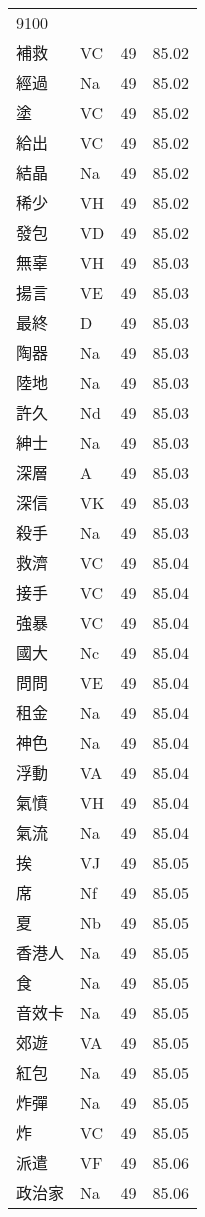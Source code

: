 \documentclass[twocolumn]{book}
\begin{document}
\begin{supertabular}{llrr}
9100\\
補救 & VC & 49 &  85.02\\
經過 & Na & 49 &  85.02\\
塗 & VC & 49 &  85.02\\
給出 & VC & 49 &  85.02\\
結晶 & Na & 49 &  85.02\\
稀少 & VH & 49 &  85.02\\
發包 & VD & 49 &  85.02\\
無辜 & VH & 49 &  85.03\\
揚言 & VE & 49 &  85.03\\
最終 & D & 49 &  85.03\\
陶器 & Na & 49 &  85.03\\
陸地 & Na & 49 &  85.03\\
許久 & Nd & 49 &  85.03\\
紳士 & Na & 49 &  85.03\\
深層 & A & 49 &  85.03\\
深信 & VK & 49 &  85.03\\
殺手 & Na & 49 &  85.03\\
救濟 & VC & 49 &  85.04\\
接手 & VC & 49 &  85.04\\
強暴 & VC & 49 &  85.04\\
國大 & Nc & 49 &  85.04\\
問問 & VE & 49 &  85.04\\
租金 & Na & 49 &  85.04\\
神色 & Na & 49 &  85.04\\
浮動 & VA & 49 &  85.04\\
氣憤 & VH & 49 &  85.04\\
氣流 & Na & 49 &  85.04\\
挨 & VJ & 49 &  85.05\\
席 & Nf & 49 &  85.05\\
夏 & Nb & 49 &  85.05\\
香港人 & Na & 49 &  85.05\\
食 & Na & 49 &  85.05\\
音效卡 & Na & 49 &  85.05\\
郊遊 & VA & 49 &  85.05\\
紅包 & Na & 49 &  85.05\\
炸彈 & Na & 49 &  85.05\\
炸 & VC & 49 &  85.05\\
派遣 & VF & 49 &  85.06\\
政治家 & Na & 49 &  85.06\\

\end{supertabular}
\end{document}
